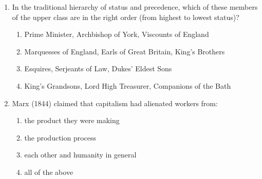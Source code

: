 \documentclass[12pt]{article}
\begin{document}
\begin{enumerate}[label=\arabic*.]
\item In the traditional hierarchy of status and precedence, which of these members of the upper class are in the right order (from highest to lowest status)?
\begin{enumerate}[label=(\alph*)]
    \item Prime Minister, Archbishop of York, Viscounts of England
    \item Marquesses of England, Earls of Great Britain, King's Brothers
    \item Esquires, Serjeants of Law, Dukes' Eldest Sons
    \item King's Grandsons, Lord High Treasurer, Companions of the Bath
\end{enumerate}
\item Marx (1844) claimed that capitalism had alienated workers from:
\begin{enumerate}[label=(\alph*)]
    \item the product they were making
    \item the production process
    \item each other and humanity in general
    \item all of the above
\end{enumerate}
\end{enumerate}
\end{document}
